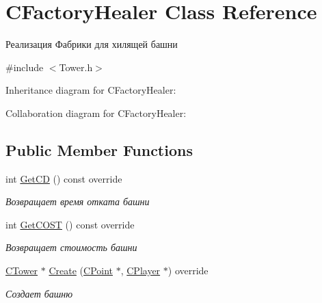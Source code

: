 \hypertarget{classCFactoryHealer}{}\section{C\+Factory\+Healer Class Reference}
\label{classCFactoryHealer}


Реализация Фабрики для хилящей башни  




{\ttfamily \#include $<$Tower.\+h$>$}



Inheritance diagram for C\+Factory\+Healer\+:


Collaboration diagram for C\+Factory\+Healer\+:
\subsection*{Public Member Functions}
\begin{DoxyCompactItemize}
\item 
int \hyperlink{classCFactoryHealer_a056922f67da48d8a683f1f0a6d647e3b}{Get\+CD} () const override\hypertarget{classCFactoryHealer_a056922f67da48d8a683f1f0a6d647e3b}{}\label{classCFactoryHealer_a056922f67da48d8a683f1f0a6d647e3b}

\begin{DoxyCompactList}\small\item\em Возвращает время отката башни \end{DoxyCompactList}\item 
int \hyperlink{classCFactoryHealer_af8b62fbfe7d91ba39d42f1338e9c666e}{Get\+C\+O\+ST} () const override\hypertarget{classCFactoryHealer_af8b62fbfe7d91ba39d42f1338e9c666e}{}\label{classCFactoryHealer_af8b62fbfe7d91ba39d42f1338e9c666e}

\begin{DoxyCompactList}\small\item\em Возвращает стоимость башни \end{DoxyCompactList}\item 
\hyperlink{classCTower}{C\+Tower} $\ast$ \hyperlink{classCFactoryHealer_acd3ce4706a9022f5799ed3a7215a41d4}{Create} (\hyperlink{classCPoint}{C\+Point} $\ast$, \hyperlink{classCPlayer}{C\+Player} $\ast$) override
\begin{DoxyCompactList}\small\item\em Создает башню \end{DoxyCompactList}\end{DoxyCompactItemize}


